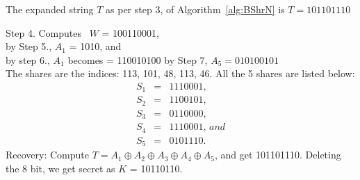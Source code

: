 \documentclass{llncs}
\begin{document}
The expanded string $T$ as per step 3, of Algorithm~\ref{alg:BShrN} is  $T = 101101110$

Step 4. Computes \, $W$ = 100110001, \\ by Step 5., $A_1$ = 1\raisebox{-0.6ex}{**}01\raisebox{-0.6ex}{***}0, and \\ by step 6., $A_1$ becomes = 110010100
by Step 7, $A_5 = 010100101$\\

The shares are the indices: 113, 101, 48, 113, 46.
All the 5 shares are listed below:
\begin{eqnarray}
  S_1 & = & 1110001, \nonumber \\
  S_2 & = & 1100101, \nonumber \\
  S_3 & = & 0110000, \nonumber \\
  S_4 & = & 1110001, \, and \nonumber \\
  S_5 & = & 0101110. \nonumber
\end{eqnarray}
Recovery: Compute $T = A_1 \oplus A_2 \oplus A_3 \oplus A_4 \oplus A_5$, and get 101101110.
Deleting the 8\raisebox{0.6ex}{th} bit, we get secret as $K$ = 10110110.
\end{document}
